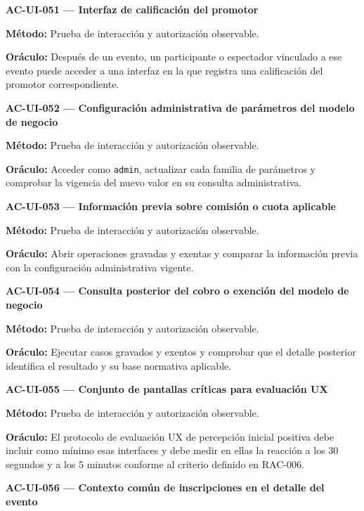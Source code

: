\documentclass[10pt,letterpaper]{article}
\begin{document}
\noindent\textbf{AC-UI-051 --- Interfaz de calificación del promotor}\par
\textbf{Método:} Prueba de interacción y autorización observable.\par
\textbf{Oráculo:} Después de un evento, un participante o espectador vinculado a ese evento puede acceder a una interfaz en la que registra una calificación del promotor correspondiente.\par\vspace{0.45em}
\noindent\textbf{AC-UI-052 --- Configuración administrativa de parámetros del modelo de negocio}\par
\textbf{Método:} Prueba de interacción y autorización observable.\par
\textbf{Oráculo:} Acceder como \texttt{admin}, actualizar cada familia de parámetros y comprobar la vigencia del nuevo valor en su consulta administrativa.\par\vspace{0.45em}
\noindent\textbf{AC-UI-053 --- Información previa sobre comisión o cuota aplicable}\par
\textbf{Método:} Prueba de interacción y autorización observable.\par
\textbf{Oráculo:} Abrir operaciones gravadas y exentas y comparar la información previa con la configuración administrativa vigente.\par\vspace{0.45em}
\noindent\textbf{AC-UI-054 --- Consulta posterior del cobro o exención del modelo de negocio}\par
\textbf{Método:} Prueba de interacción y autorización observable.\par
\textbf{Oráculo:} Ejecutar casos gravados y exentos y comprobar que el detalle posterior identifica el resultado y su base normativa aplicable.\par\vspace{0.45em}
\noindent\textbf{AC-UI-055 --- Conjunto de pantallas críticas para evaluación UX}\par
\textbf{Método:} Prueba de interacción y autorización observable.\par
\textbf{Oráculo:} El protocolo de evaluación UX de percepción inicial positiva debe incluir como mínimo esas interfaces y debe medir en ellas la reacción a los 30 segundos y a los 5 minutos conforme al criterio definido en RAC-006.\par\vspace{0.45em}
\noindent\textbf{AC-UI-056 --- Contexto común de inscripciones en el detalle del evento}\par
\end{document}
